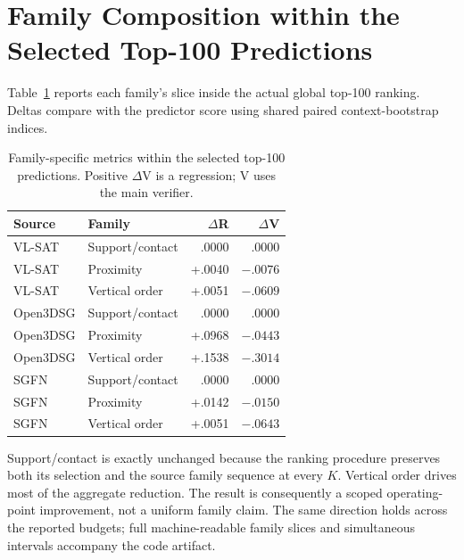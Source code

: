 \section{Family Composition within the Selected Top-100 Predictions}

Table~\ref{tab:family-slices} reports each family's slice inside the actual
global top-100 ranking. Deltas compare \method{} with the predictor score
using shared paired context-bootstrap indices.

\begin{table}[t]
\centering
{\small
\setlength{\tabcolsep}{4pt}
\begin{tabular}{llrr}
\toprule
Source & Family & $\Delta$R & $\Delta$V \\
\midrule
VL-SAT & Support/contact & .0000 & .0000 \\
VL-SAT & Proximity & +.0040 & $-.0076$ \\
VL-SAT & Vertical order & +.0051 & $-.0609$ \\
\midrule
Open3DSG & Support/contact & .0000 & .0000 \\
Open3DSG & Proximity & +.0968 & $-.0443$ \\
Open3DSG & Vertical order & +.1538 & $-.3014$ \\
\midrule
SGFN & Support/contact & .0000 & .0000 \\
SGFN & Proximity & +.0142 & $-.0150$ \\
SGFN & Vertical order & +.0051 & $-.0643$ \\
\bottomrule
\end{tabular}
}
\caption{Family-specific metrics within the selected top-100 predictions.
Positive $\Delta$V is a regression; V uses the main verifier.}
\label{tab:family-slices}
\end{table}

Support/contact is exactly unchanged because the ranking procedure preserves both its
selection and the source family sequence at every $K$. Vertical
order drives most of the aggregate reduction. The result is consequently a
scoped operating-point improvement, not a uniform family claim. The same
direction holds across the reported budgets; full machine-readable family
slices and simultaneous intervals accompany the code artifact.
